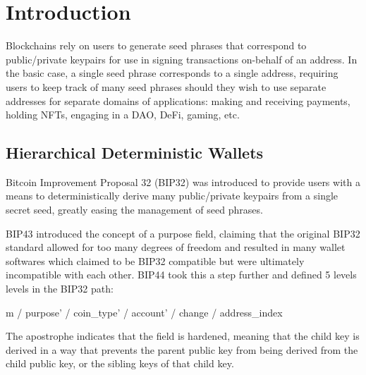 \documentclass[12pt, a4paper, twocolumn]{article}
\begin{document}

\twocolumn[
  \begin{@twocolumnfalse}
    \maketitle
    \begin{abstract}
      \abstractText
      \newline
      \newline
    \end{abstract}
  \end{@twocolumnfalse}
]


\section{Introduction}

Blockchains rely on users to generate seed phrases that correspond to public/private keypairs for use in signing transactions on-behalf of an address. In the basic case, a single seed phrase corresponds to a single address, requiring users to keep track of many seed phrases should they wish to use separate addresses for separate domains of applications: making and receiving payments, holding NFTs, engaging in a DAO, DeFi, gaming, etc.


\subsection{Hierarchical Deterministic Wallets}


Bitcoin Improvement Proposal 32 (BIP32) was introduced to provide users with a means to deterministically derive many public/private keypairs from a single secret seed, greatly easing the management of seed phrases.

BIP43 introduced the concept of a purpose field, claiming that the original BIP32 standard allowed for too many degrees of freedom and resulted in many wallet softwares which claimed to be BIP32 compatible but were ultimately incompatible with each other. BIP44 took this a step further and defined 5 levels levels in the BIP32 path:

m / purpose' / coin_type' / account' / change / address_index

The apostrophe indicates that the field is hardened, meaning that the child key is derived in a way that prevents the parent public key from being derived from the child public key, or the sibling keys of that child key.
\end{document}
